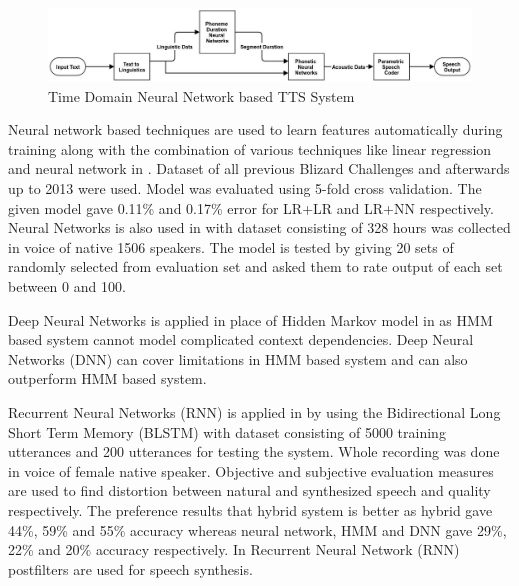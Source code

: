 \begin{center}
	\begin{figure}[hbtp]
		\centering
		\includegraphics[width=\linewidth]{images/time_domain_neural_network.jpg}
		\caption{Time Domain Neural Network based TTS System}
		\label{fig:Time Domain Neural Network based TTS System}
	\end{figure}
		
\end{center}
Neural network based techniques are used to learn features automatically during training along with the combination of various techniques 
like linear regression and neural network in \cite{yoshimura2016hierarchical}. Dataset of all previous Blizard Challenges \cite{blizzard_2009_corpus} and
afterwards up to 2013 were used. Model was evaluated using 5-fold cross validation. The given model gave 0.11\% and 0.17\% error for LR+LR and LR+NN 
respectively. Neural Networks is also used in \cite{wu2016merlin} with dataset consisting of 328 hours was collected in
voice of native 1506 speakers. The model is tested by giving 20 sets of randomly selected from
evaluation set and asked them to rate output of each set between 0 and 100.

Deep Neural Networks is applied in place of Hidden Markov model in \cite{ze2013statistical} as HMM
based system cannot model complicated context dependencies. Deep Neural Networks (DNN) can
cover limitations in HMM based system and can also outperform HMM based system. 

Recurrent Neural Networks (RNN) is applied in \cite{fan2014tts} by using the Bidirectional Long
Short Term Memory (BLSTM) with dataset consisting of 5000 training utterances and 200
utterances for testing the system. Whole recording was done in voice of female native speaker.
Objective and subjective evaluation measures are used to find distortion between natural and
synthesized speech and quality respectively. The preference results that hybrid system is better as
hybrid gave 44\%, 59\% and 55\% accuracy whereas neural network, HMM and DNN gave 29\%,
22\% and 20\% accuracy respectively. In \cite{muthukumar2016recurrent} Recurrent Neural Network (RNN) postfilters 
are used for speech synthesis. 

